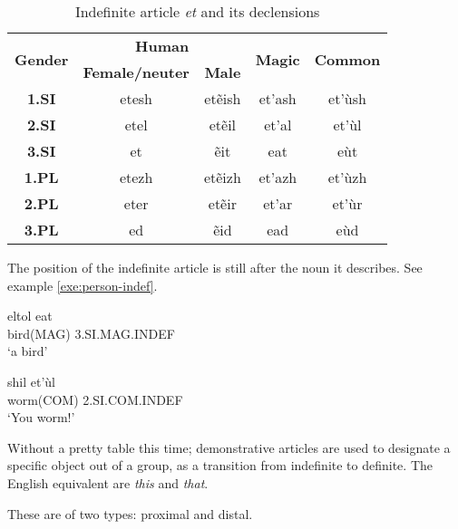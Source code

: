\begin{table}[h]
\begin{center}\label{tab:morph-indef-pers-suff}
\begin{tabular}{|c||c|c|c|c|}
\hline
\multirow{2}{*}{\textbf{Gender}} & \multicolumn{2}{|c|}{\textbf{Human}} & \multirow{2}{*}{\textbf{Magic}} & \multirow{2}{*}{\textbf{Common}}\\
                                 & \textbf{Female/neuter} & \textbf{Male} & & \\\hline\hline
\textbf{1.SI}                    & etesh & etẽish & et’ash & et’ùsh \\\hline
\textbf{2.SI}                    & etel  & etẽil  & et’al  & et’ùl  \\\hline
\textbf{3.SI}                    & et    & ẽit    & eat    & eùt    \\\hline
\textbf{1.PL}                    & etezh & etẽizh & et’azh & et’ùzh \\\hline
\textbf{2.PL}                    & eter  & etẽir  & et’ar  & et’ùr  \\\hline
\textbf{3.PL}                    & ed    & ẽid    & ead    & eùd    \\\hline
\end{tabular}
\end{center}
\caption{Indefinite article \emph{et} and its declensions}
\end{table}

The position of the indefinite article is still after the noun it describes. See example
\ref{exe:person-indef}.

\begin{exe}
\ex\label{exe:person-indef}
\begin{xlist}
\ex\gll \gls{eltol} eat\\
bird(MAG) 3.SI.MAG.INDEF\\
\trans ‘a bird’

\ex\gll {}\gls{shil} et’ùl\\
worm(COM) 2.SI.COM.INDEF\\
\trans ‘You worm!’
\end{xlist}
\end{exe}

Without a pretty table this time; demonstrative articles are used to designate a specific object out
of a group, as a transition from indefinite to definite. The English equivalent are \emph{this} and
\emph{that}.

These are of two types: proximal and distal.

